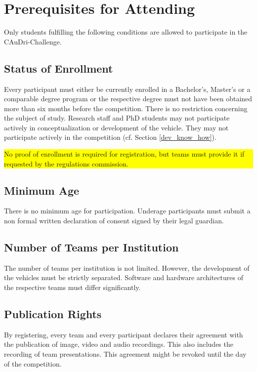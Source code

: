 \chapter{Prerequisites for Attending}

Only students fulfilling the following conditions are allowed to participate in
the CAuDri-Challenge.

\section{Status of Enrollment}

Every participant must either be currently enrolled in a Bachelor’s, Master’s
or a comparable degree program or the respective degree must not have been
obtained more than six months before the competition. There is no restriction
concerning the subject of study. Research staff and PhD students may not
participate actively in conceptualization or development of the vehicle. They
may not participate actively in the competition (cf. Section
\ref{dev_know_how}).\\
\colorbox{yellow}{\parbox{\colorboxwidth}{No proof of enrollment is required
for registration, but teams must provide it if requested by the regulations
commission.}}

\section{Minimum Age}

There is no minimum age for participation. Underage participants must submit a non formal written declaration of consent signed by their legal guardian.

\section{Number of Teams per Institution}

The number of teams per institution is not limited. However, the development of
the vehicles must be strictly separated. Software and hardware architectures of
the respective teams must differ significantly.

\section{Publication Rights}

By registering, every team and every participant declares their agreement with
the publication of image, video and audio recordings. This also includes the
recording of team presentations. This agreement might be revoked until the day
of the competition.
